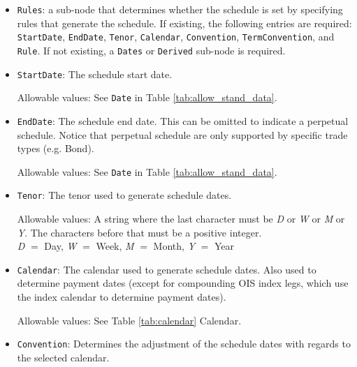 \begin{itemize}
\item \lstinline!Rules!: a sub-node that determines whether the schedule is set by specifying rules that
generate the schedule. If existing, the following entries are required: \lstinline!StartDate!, \lstinline!EndDate!, \lstinline!Tenor!, \lstinline!Calendar!, 
\lstinline!Convention!, \lstinline!TermConvention!, and \lstinline!Rule!. If not existing, a \lstinline!Dates! or \lstinline!Derived!
sub-node is required.
\item \lstinline!StartDate!:  The schedule start date.  

Allowable values:  See \lstinline!Date! in Table \ref{tab:allow_stand_data}.

\item \lstinline!EndDate!: The schedule end date. This can be omitted to indicate a perpetual schedule. Notice that perpetual
  schedule are only supported by specific trade types (e.g. Bond).

Allowable values:  See \lstinline!Date! in Table \ref{tab:allow_stand_data}.

\item \lstinline!Tenor!: The tenor used to generate schedule dates. 

Allowable values: A string where the last character must be \emph{D} or \emph{W} or
\emph{M} or \emph{Y}.  The characters before that must be a positive integer. \\ \emph{D}
$=$ Day, \emph{W} $=$ Week, \emph{M} $=$ Month, \emph{Y} $=$ Year

\item \lstinline!Calendar!: The calendar used to generate schedule  dates. Also used to determine payment dates (except for compounding OIS index legs, which use the index calendar to determine payment dates).

Allowable values: See Table \ref{tab:calendar} Calendar.

\item \lstinline!Convention!: Determines the adjustment of the schedule dates with
  regards to the selected calendar. 


\end{itemize}
